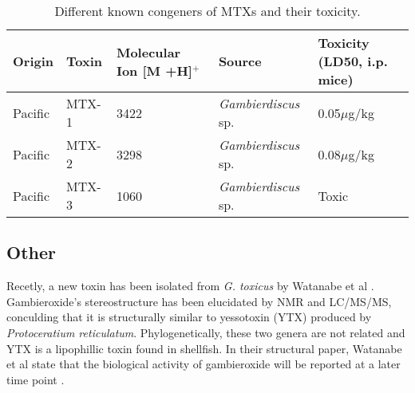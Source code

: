 \documentclass[12pt]{article}
\begin{document}

\begin{table}
\caption{Different known congeners of MTXs and their toxicity.}
\begin{tabular}{ |  p{2cm} | p{2cm} | p{3cm} | p{3cm} | p{4cm} | }
\hline
\textbf{Origin} & \textbf{Toxin} & \textbf{Molecular Ion [M +H]$^{+}$} & \textbf{Source} & \textbf{Toxicity (LD50, i.p. mice)} \\
\hline
 Pacific & MTX-1 & 3422 \cite{holmes1994purification,murata1993structure} & \emph{Gambierdiscus} sp. \cite{holmes1994purification} & 0.05$\mu$g/kg \cite{murata1993structure}\\
\hline
 Pacific & MTX-2 & 3298 \cite{holmes1994purification} & \emph{Gambierdiscus} sp. \cite{holmes1994purification} & 0.08$\mu$g/kg \cite{holmes1994purification}\\
\hline
 Pacific & MTX-3 & 1060   \cite{holmes1994purification} & \emph{Gambierdiscus} sp. \cite{holmes1994purification} & Toxic \cite{holmes1994purification} \\
\hline
\end{tabular}
\end{table}
\FloatBarrier

\subsection{Other}
Recetly, a new toxin has been isolated from \emph{G. toxicus} by Watanabe et al \cite{watanabe2013gambieroxide}. Gambieroxide's stereostructure has been elucidated by NMR and LC/MS/MS, conculding that it is structurally similar to yessotoxin (YTX) produced by \emph{Protoceratium reticulatum}. Phylogenetically, these two genera are not related and YTX is a lipophillic toxin found in shellfish. In their structural paper, Watanabe et al state that the biological activity of gambieroxide will be reported at a later time point \cite{watanabe2013gambieroxide}.
\end{document}
